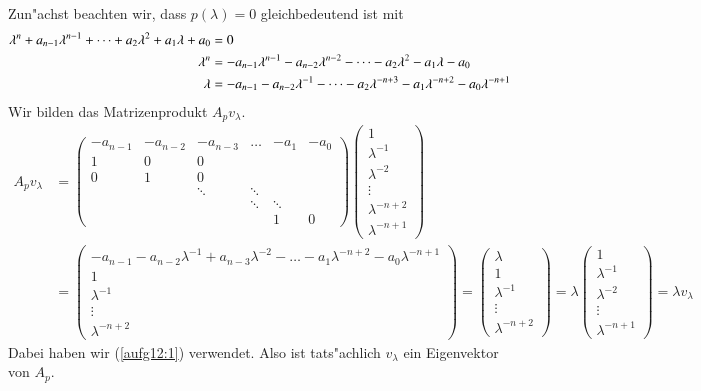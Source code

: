 \begin{loesung}
Zun"achst beachten wir, dass $p(\lambda)=0$ gleichbedeutend ist mit
\begin{align}
\lambda^n
+
a_{n-1}\lambda^{n-1}
+
\dots
+
a_2\lambda^2
+
a_1\lambda
+
a_0
&=0
\notag
\\
\lambda^n
&=
-a_{n-1}\lambda^{n-1}
-
a_{n-2}\lambda^{n-2}
-
\dots
-
a_2\lambda^2
-
a_1\lambda
-
a_0
\notag
\\
\lambda&=
-a_{n-1}
-
a_{n-2}\lambda^{-1}
-
\dots
-
a_2\lambda^{-n+3}
-
a_1\lambda^{-n+2}
-
a_0\lambda^{-n+1}
\label{aufg12:1}
\end{align}
Wir bilden das Matrizenprodukt $A_pv_\lambda$.
\begin{align*}
A_pv_\lambda
&=
\begin{pmatrix}
-a_{n-1}&-a_{n-2}&-a_{n-3}& \dots&  -a_1&-a_0\\
       1&       0&       0&      &      &    \\
       0&       1&       0&      &      &    \\
        &        &  \ddots&\ddots&      &    \\
        &        &        &\ddots&\ddots&    \\
        &        &        &      &     1&   0
\end{pmatrix}
\begin{pmatrix}
1\\\lambda^{-1}\\\lambda^{-2}\\\vdots\\\lambda^{-n+2}\\\lambda^{-n+1}
\end{pmatrix}
\\
&=
\begin{pmatrix}
-a_{n-1}-a_{n-2}\lambda^{-1}+a_{n-3}\lambda^{-2}-\dots-a_1\lambda^{-n+2}-a_0\lambda^{-n+1}
\\
1\\
\lambda^{-1}\\
\vdots\\
\lambda^{-n+2}
\end{pmatrix}
=
\begin{pmatrix}
\lambda \\
1\\
\lambda^{-1}\\
\vdots\\
\lambda^{-n+2}
\end{pmatrix}
=
\lambda
\begin{pmatrix}
1\\
\lambda^{-1}\\
\lambda^{-2}\\
\vdots\\
\lambda^{-n+1}
\end{pmatrix}
=\lambda v_\lambda
\end{align*}
Dabei haben wir (\ref{aufg12:1}) verwendet.
Also ist tats"achlich $v_\lambda$ ein Eigenvektor von $A_p$.
\end{loesung}
